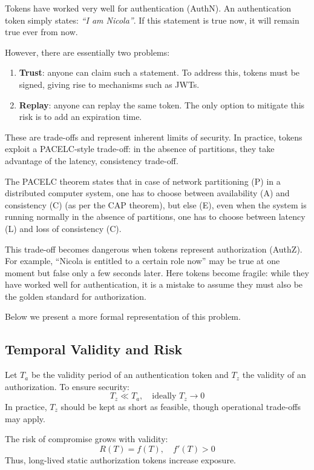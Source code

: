 Tokens have worked very well for authentication (AuthN).  
An authentication token simply states: \emph{``I am Nicola''}.  
If this statement is true now, it will remain true ever from now.  

However, there are essentially two problems:
\begin{enumerate}
    \item \textbf{Trust}: anyone can claim such a statement.  
    To address this, tokens must be signed, giving rise to mechanisms such as JWTs.
    \item \textbf{Replay}: anyone can replay the same token.  
    The only option to mitigate this risk is to add an expiration time.
\end{enumerate}

These are trade-offs and represent inherent limits of security.  
In practice, tokens exploit a PACELC-style trade-off: in the absence of partitions, they take advantage of the latency, consistency trade-off.  

\begin{boxF}
    The PACELC theorem \cite{c9} states that in case of network partitioning (P) in a distributed computer system, one has to choose between availability (A) and consistency (C) (as per the CAP theorem), but else (E), even when the system is running normally in the absence of partitions, one has to choose between latency (L) and loss of consistency (C).
\end{boxF}

This trade-off becomes dangerous when tokens represent authorization (AuthZ).  
For example, ``Nicola is entitled to a certain role now'' may be true at one moment 
but false only a few seconds later.  
Here tokens become fragile: while they have worked well for authentication, 
it is a mistake to assume they must also be the golden standard for authorization.  

Below we present a more formal representation of this problem.

\subsection{Temporal Validity and Risk}
Let $T_a$ be the validity period of an authentication token and $T_z$ the validity of an authorization.  
To ensure security:
\[
T_z \ll T_a, \quad \text{ideally } T_z \to 0
\]
In practice, $T_z$ should be kept as short as feasible, though operational trade-offs may apply.  

The risk of compromise grows with validity:
\[
R(T) = f(T), \quad f'(T) > 0
\]
Thus, long-lived static authorization tokens increase exposure.

